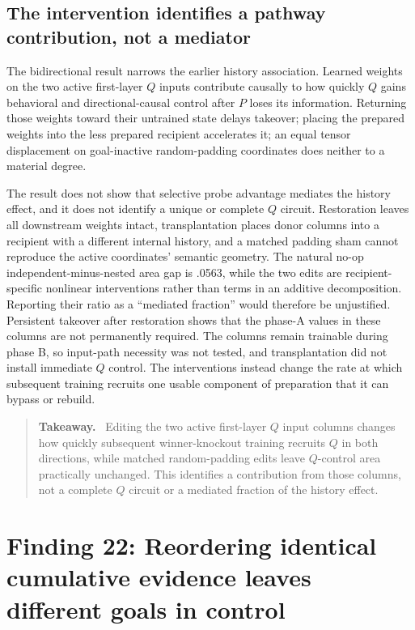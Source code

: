 \documentclass[11pt,a4paper]{article}
\newenvironment{takeaway}{%
  \begin{quote}\small\color{ink}\noindent\textbf{Takeaway.}\ 
}{%
  \end{quote}
}
\begin{document}
\subsection*{The intervention identifies a pathway contribution, not a mediator}

The bidirectional result narrows the earlier history association. Learned weights on the two active first-layer $Q$ inputs contribute causally to how quickly $Q$ gains behavioral and directional-causal control after $P$ loses its information. Returning those weights toward their untrained state delays takeover; placing the prepared weights into the less prepared recipient accelerates it; an equal tensor displacement on goal-inactive random-padding coordinates does neither to a material degree.

The result does not show that selective probe advantage mediates the history effect, and it does not identify a unique or complete $Q$ circuit. Restoration leaves all downstream weights intact, transplantation places donor columns into a recipient with a different internal history, and a matched padding sham cannot reproduce the active coordinates' semantic geometry. The natural no-op independent-minus-nested area gap is .0563, while the two edits are recipient-specific nonlinear interventions rather than terms in an additive decomposition. Reporting their ratio as a ``mediated fraction'' would therefore be unjustified. Persistent takeover after restoration shows that the phase-A values in these columns are not permanently required. The columns remain trainable during phase B, so input-path necessity was not tested, and transplantation did not install immediate $Q$ control. The interventions instead change the rate at which subsequent training recruits one usable component of preparation that it can bypass or rebuild.

\begin{takeaway}
Editing the two active first-layer $Q$ input columns changes how quickly subsequent winner-knockout training recruits $Q$ in both directions, while matched random-padding edits leave $Q$-control area practically unchanged. This identifies a contribution from those columns, not a complete $Q$ circuit or a mediated fraction of the history effect.
\end{takeaway}

\section*{Finding 22: Reordering identical cumulative evidence leaves different goals in control}
\end{document}
